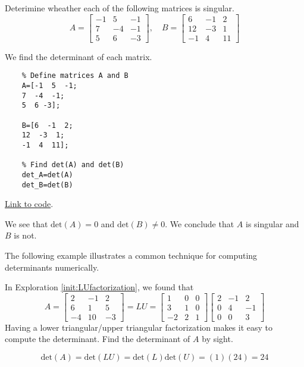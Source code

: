 \documentclass{ximera}
\begin{document}
\begin{example}\label{ex_oct_det_singular}
  Deterimine wheather each of the following matrices is singular.
  $$A=\begin{bmatrix}-1 & 5 & -1\\7 & -4 & -1\\5 & 6 & -3\end{bmatrix},\quad B=\begin{bmatrix}6 & -1 & 2\\12 & -3 & 1\\-1 & 4 & 11\end{bmatrix}$$
  \begin{explanation}
  We find the determinant of each matrix.
  \begin{verbatim}
    % Define matrices A and B
    A=[-1  5  -1;
    7  -4  -1;
    5  6 -3];

    B=[6  -1  2;
    12  -3  1;
    -1  4  11];

    % Find det(A) and det(B)
    det_A=det(A)
    det_B=det(B)
  \end{verbatim}

\href{https://sagecell.sagemath.org/?z=eJwtjbsKgDAMRfdC_-Eugg4d4nOQDi3iT4iIaIUOOmj_H1PrlHMfSTIM7vCXw7mG22_ugcF67bBSGD0pAhpAUS9Fx7P-mb0WqpoZpbB6aqMPlKypZK6AWIserxClYobR8-ndhdwU35eItpCC52J0CpKyOmUvBfgj9w==&lang=octave&interacts=eJyLjgUAARUAuQ==}{Link to code}.

We see that $\text{det}(A)=0$ and $\text{det}(B)\neq 0$.  We conclude that $A$ is singular and $B$ is not.

  \end{explanation}
\end{example}

The following example illustrates a common technique for computing determinants numerically.
\begin{example}\label{ex_oct_det_LU}
  In Exploration \ref{init:LUfactorization}, we found that
  $$A=\begin{bmatrix}2&-1&2\\6&1&5\\-4&10&-3\end{bmatrix}=LU=\begin{bmatrix}1&0&0\\3&1&0\\-2&2&1\end{bmatrix}\begin{bmatrix}2&-1&2\\0&4&-1\\0&0&3\end{bmatrix}$$
  Having a lower triangular/upper triangular factorization makes it easy to compute the determinant. Find the determinant of $A$ by sight.
  \begin{explanation}
    $$\text{det}(A)=\text{det}(LU)=\text{det}(L)\text{det}(U)=(1)(24)=24$$
  \end{explanation} 
\end{example}
\end{document}
